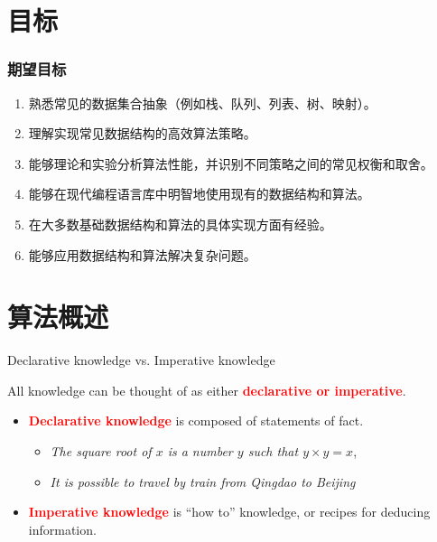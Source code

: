\documentclass{sintefbeamer}
\begin{document}
\section{目标}

\begin{frame}
  \frametitle{期望目标}

  \begin{enumerate}
    \item 熟悉常见的数据集合抽象（例如栈、队列、列表、树、映射）。
    \item 理解实现常见数据结构的高效算法策略。
    \item 能够理论和实验分析算法性能，并识别不同策略之间的常见权衡和取舍。
    \item 能够在现代编程语言库中明智地使用现有的数据结构和算法。
    \item 在大多数基础数据结构和算法的具体实现方面有经验。
    \item 能够应用数据结构和算法解决复杂问题。
  \end{enumerate}

\end{frame}

\section{算法概述}

\begin{frame}{Declarative knowledge vs. Imperative knowledge}

  All knowledge can be thought of as either \textcolor{red}{\textbf{declarative or imperative}}.

  \begin{itemize}[<+->]
    \item \textcolor{red}{\textbf{Declarative knowledge}} is composed of statements of fact.
          \begin{itemize}
            \item \textit{The square root of $x$ is a number $y$ such that $y \times y = x$},
            \item \textit{It is possible to travel by train from Qingdao to Beijing}
          \end{itemize}
    \item \textcolor{red}{\textbf{Imperative knowledge}} is ``how to'' knowledge, or recipes for deducing information.
  \end{itemize}

\end{frame}
\end{document}
